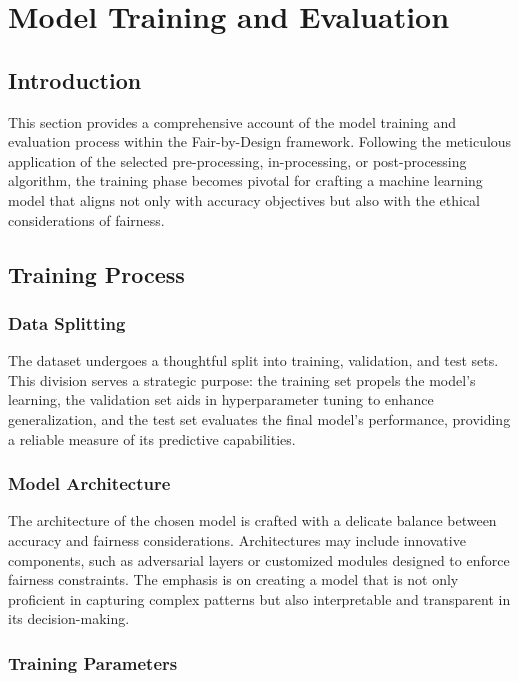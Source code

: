 \section{Model Training and Evaluation}
\label{section:model-training}

\subsection{Introduction}

This section provides a comprehensive account of the model training and evaluation process within the Fair-by-Design framework. Following the meticulous application of the selected pre-processing, in-processing, or post-processing algorithm, the training phase becomes pivotal for crafting a machine learning model that aligns not only with accuracy objectives but also with the ethical considerations of fairness.

\subsection{Training Process}

\subsubsection{Data Splitting}

The dataset undergoes a thoughtful split into training, validation, and test sets. This division serves a strategic purpose: the training set propels the model's learning, the validation set aids in hyperparameter tuning to enhance generalization, and the test set evaluates the final model's performance, providing a reliable measure of its predictive capabilities.

\subsubsection{Model Architecture}

The architecture of the chosen model is crafted with a delicate balance between accuracy and fairness considerations. Architectures may include innovative components, such as adversarial layers or customized modules designed to enforce fairness constraints. The emphasis is on creating a model that is not only proficient in capturing complex patterns but also interpretable and transparent in its decision-making.

\subsubsection{Training Parameters}

